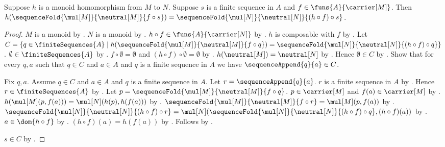 \begin{lemma}\label{monoid_sequence_fold_hom}
    Suppose $h$ is a monoid homomorphism from $M$ to $N$.
    Suppose $s$ is a finite sequence in $A$ and
        $f\in\funs{A}{\carrier[M]}$.
    Then
        $h(\sequenceFold{\mul[M]}{\neutral[M]}{f\circ s})
        =\sequenceFold{\mul[N]}{\neutral[N]}{(h\circ f)\circ s}$.
\end{lemma}
\begin{proof}
    $M$ is a monoid by .
    $N$ is a monoid by .
    $h\circ f\in\funs{A}{\carrier[N]}$ by
        .
    $h$ is composable with $f$ by
        .
    Let $C=\{q\in\finiteSequences{A}\mid
        h(\sequenceFold{\mul[M]}{\neutral[M]}{f\circ q})
        =\sequenceFold{\mul[N]}{\neutral[N]}{(h\circ f)\circ q}\}$.
    $\emptyset\in\finiteSequences{A}$ by
        .
    $f\circ\emptyset=\emptyset$ and
        $(h\circ f)\circ\emptyset=\emptyset$ by
        .
    $h(\neutral[M])=\neutral[N]$ by .
    Hence $\emptyset\in C$ by .
    Show that for every $q,a$ such that
        $q\in C$ and $a\in A$ and $q$ is a finite sequence in $A$
        we have $\sequenceAppend{q}{a}\in C$.
    \begin{subproof}
        Fix $q,a$.
        Assume $q\in C$ and $a\in A$ and
            $q$ is a finite sequence in $A$.
        Let $r=\sequenceAppend{q}{a}$.
        $r$ is a finite sequence in $A$ by
            .
        Hence $r\in\finiteSequences{A}$ by
            .
        Let $p=\sequenceFold{\mul[M]}{\neutral[M]}{f\circ q}$.
        $p\in\carrier[M]$ and $f(a)\in\carrier[M]$ by
            .
        $h(\mul[M](p,f(a)))=\mul[N](h(p),h(f(a)))$ by
            .
        $\sequenceFold{\mul[M]}{\neutral[M]}{f\circ r}
            =\mul[M](p,f(a))$ by
            .
        $\sequenceFold{\mul[N]}{\neutral[N]}{(h\circ f)\circ r}
            =\mul[N](
                \sequenceFold{\mul[N]}{\neutral[N]}{
                    (h\circ f)\circ q},
                (h\circ f)(a))$ by
            .
        $a\in\dom{h\circ f}$ by
            .
        $(h\circ f)(a)=h(f(a))$ by
            .
        Follows by \auto.
    \end{subproof}
    $s\in C$ by .
\end{proof}

